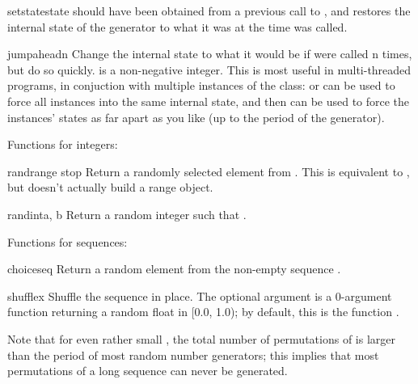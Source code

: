 {\begin{funcdesc}{setstate}{state}
   should have been obtained from a previous call to
  , and  restores the internal state
  of the generator to what it was at the time  was called.
 \end{funcdesc}

\begin{funcdesc}{jumpahead}{n}
  Change the internal state to what it would be if  were
  called n times, but do so quickly.   is a non-negative integer.
  This is most useful in multi-threaded programs, in conjuction with
  multiple instances of the  class:   or
   can be used to force all instances into the same
  internal state, and then  can be used to force the
  instances' states as far apart as you like (up to the period of the
  generator).
 \end{funcdesc}

Functions for integers:

\begin{funcdesc}{randrange}{ stop}
  Return a randomly selected element from .  This is equivalent to
  ,
  but doesn't actually build a range object.
\end{funcdesc}

\begin{funcdesc}{randint}{a, b}
  Return a random integer  such that
  .
\end{funcdesc}


Functions for sequences:

\begin{funcdesc}{choice}{seq}
  Return a random element from the non-empty sequence .
\end{funcdesc}

\begin{funcdesc}{shuffle}{x}
  Shuffle the sequence  in place.
  The optional argument  is a 0-argument function
  returning a random float in [0.0, 1.0); by default, this is the
  function .

  Note that for even rather small , the total
  number of permutations of  is larger than the period of most
  random number generators; this implies that most permutations of a
  long sequence can never be generated.
\end{funcdesc}


}
